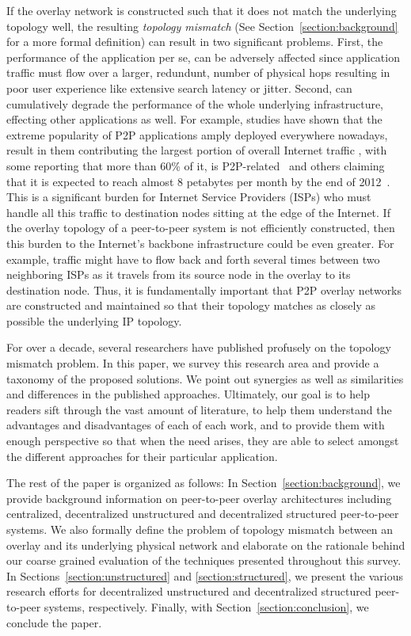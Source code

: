 If the overlay network is constructed such that it does not match the underlying
topology well, the resulting \emph{topology mismatch} (See
Section~\ref{section:background} for a more formal definition) can result in two
significant problems. First, the performance of the application per se, can be
adversely affected since application traffic must flow over a larger,
redundunt, number of physical hops resulting in poor user experience like
extensive search latency or jitter. Second, can cumulatively degrade the
performance of the whole underlying infrastructure, effecting other applications
as well. For example, studies have shown that the extreme popularity of P2P
applications amply deployed everywhere nowadays, result in them contributing the
largest portion of overall Internet traffic
\cite{seroiu_analysiscds_2002,sen_analyzep2ptraffic_2004,krp_ispfear_2005}, with
some reporting that more than 60\% of it, is
P2P-related~\cite{cachelogic,ipoque2007,ipoque2009} and others claiming that it
is expected to reach almost 8 petabytes per month by the end of
2012~\cite{multinteligence}. This is a significant burden for Internet Service
Providers (ISPs) who must handle all this traffic to destination nodes sitting
at the edge of the Internet. If the overlay topology of a peer-to-peer system is
not efficiently constructed, then this burden to the Internet's backbone
infrastructure could be even greater. For example, traffic might have to flow
back and forth several times between two neighboring ISPs as it travels from its
source node in the overlay to its destination node. Thus, it is fundamentally
important that P2P overlay networks are constructed and maintained so that
their topology matches as closely as possible the underlying IP topology. 

For over a decade, several researchers have published profusely on the topology
mismatch problem.  In this paper, we survey this research area and provide a
taxonomy of the proposed solutions. We point out synergies as well as
similarities and differences in the published approaches. Ultimately, our goal
is to help readers sift through the vast amount of literature, to help them
understand the advantages and disadvantages of each of each work, and to provide
them with enough perspective so that when the need arises, they are able to
select amongst the different approaches for their particular application.

The rest of the paper is organized as follows: In
Section~\ref{section:background}, we provide background information on
peer-to-peer overlay architectures including centralized, decentralized
unstructured and decentralized structured peer-to-peer systems. We also formally
define the problem of topology mismatch between an overlay and its underlying
physical network and elaborate on the rationale behind our coarse grained
evaluation of the techniques presented throughout this survey. In
Sections~\ref{section:unstructured} and \ref{section:structured}, we present the
various research efforts for decentralized unstructured and decentralized
structured peer-to-peer systems, respectively. Finally, with
Section~\ref{section:conclusion}, we conclude the paper.

